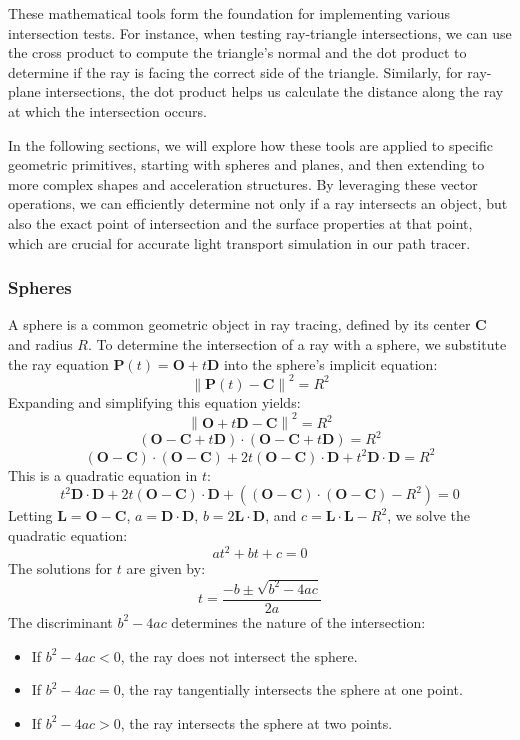 \documentclass[12pt]{article}
\begin{document}
These mathematical tools form the foundation for implementing various intersection tests. For instance, when testing ray-triangle intersections, we can use the cross product to compute the triangle's normal and the dot product to determine if the ray is facing the correct side of the triangle. Similarly, for ray-plane intersections, the dot product helps us calculate the distance along the ray at which the intersection occurs.

In the following sections, we will explore how these tools are applied to specific geometric primitives, starting with spheres and planes, and then extending to more complex shapes and acceleration structures. By leveraging these vector operations, we can efficiently determine not only if a ray intersects an object, but also the exact point of intersection and the surface properties at that point, which are crucial for accurate light transport simulation in our path tracer.

\subsubsection{Spheres}

A sphere is a common geometric object in ray tracing, defined by its center \(\mathbf{C}\) and radius \(R\). To determine the intersection of a ray with a sphere, we substitute the ray equation \(\mathbf{P}(t) = \mathbf{O} + t\mathbf{D}\) into the sphere's implicit equation:
\[
    \left\| \mathbf{P}(t) - \mathbf{C} \right\|^2 = R^2
\]
Expanding and simplifying this equation yields:
\[
    \left\| \mathbf{O} + t\mathbf{D} - \mathbf{C} \right\|^2 = R^2
\]
\[
    \left( \mathbf{O} - \mathbf{C} + t\mathbf{D} \right) \cdot \left( \mathbf{O} - \mathbf{C} + t\mathbf{D} \right) = R^2
\]
\[
    (\mathbf{O} - \mathbf{C}) \cdot (\mathbf{O} - \mathbf{C}) + 2t \left( \mathbf{O} - \mathbf{C} \right) \cdot \mathbf{D} + t^2 \mathbf{D} \cdot \mathbf{D} = R^2
\]
This is a quadratic equation in \(t\):
\[
    t^2 \mathbf{D} \cdot \mathbf{D} + 2t \left( \mathbf{O} - \mathbf{C} \right) \cdot \mathbf{D} + \left( (\mathbf{O} - \mathbf{C}) \cdot (\mathbf{O} - \mathbf{C}) - R^2 \right) = 0
\]
Letting \(\mathbf{L} = \mathbf{O} - \mathbf{C}\), \(a = \mathbf{D} \cdot \mathbf{D}\), \(b = 2 \mathbf{L} \cdot \mathbf{D}\), and \(c = \mathbf{L} \cdot \mathbf{L} - R^2\), we solve the quadratic equation:
\[
    at^2 + bt + c = 0
\]
The solutions for \(t\) are given by:
\[
    t = \frac{-b \pm \sqrt{b^2 - 4ac}}{2a}
\]
The discriminant \(b^2 - 4ac\) determines the nature of the intersection:
\begin{itemize}
    \item If \(b^2 - 4ac < 0\), the ray does not intersect the sphere.
    \item If \(b^2 - 4ac = 0\), the ray tangentially intersects the sphere at one point.
    \item If \(b^2 - 4ac > 0\), the ray intersects the sphere at two points.
\end{itemize}
\end{document}
